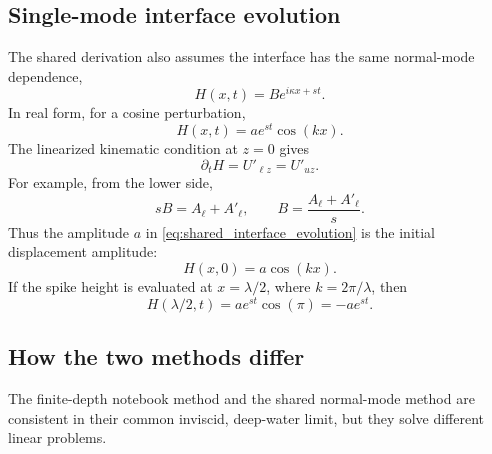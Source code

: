 \documentclass[11pt,a4paper]{article}
\begin{document}
\subsection{Single-mode interface evolution}

The shared derivation also assumes the interface has the same normal-mode dependence,
\begin{equation}
    H(x,t)=B e^{i\kappa x+st}.
\end{equation}
In real form, for a cosine perturbation,
\begin{equation}
    H(x,t)=a e^{st}\cos(kx).
    \label{eq:shared_interface_evolution}
\end{equation}
The linearized kinematic condition at $z=0$ gives
\begin{equation}
    \partial_t H = U'_{\ell z}=U'_{u z}.
\end{equation}
For example, from the lower side,
\begin{equation}
    sB=A_{\ell}+A'_{\ell},
    \qquad
    B=\frac{A_{\ell}+A'_{\ell}}{s}.
\end{equation}
Thus the amplitude $a$ in \eqref{eq:shared_interface_evolution} is the initial displacement amplitude:
\begin{equation}
    H(x,0)=a\cos(kx).
\end{equation}
If the spike height is evaluated at $x=\lambda/2$, where $k=2\pi/\lambda$, then
\begin{equation}
    H(\lambda/2,t)
    =
    a e^{st}\cos(\pi)
    =
    -a e^{st}.
\end{equation}

\subsection{How the two methods differ}

The finite-depth notebook method and the shared normal-mode method are consistent in their common inviscid, deep-water limit, but they solve different linear problems.
\end{document}
